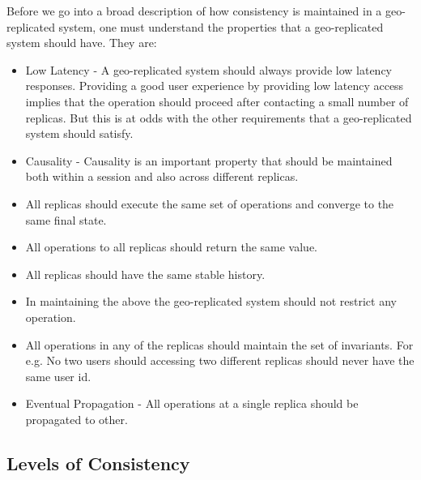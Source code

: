 \documentclass[12pt]{article}
\theoremstyle{plain}
\theoremstyle{definition}
\theoremstyle{remark}
\begin{document}
Before we go into a broad description of how consistency is maintained in a geo-replicated system, one must understand the properties that a geo-replicated system should have. They are:
\begin{itemize}
\item Low Latency - A geo-replicated system should always provide low latency responses. Providing a good user experience by providing low latency access implies that the operation should proceed after contacting a small number of replicas. But this is at odds with the other requirements that a geo-replicated system should satisfy.
\item Causality - Causality is an important property that should be maintained both within a session and also across different replicas.
\item All replicas should execute the same set of operations and converge to the same final state.
\item All operations to all replicas should return the same value.
\item All replicas should have the same stable history. 
\item In maintaining the above the geo-replicated system should not restrict any operation.
\item All operations in any of the replicas should maintain the set of invariants. For e.g. No two users should accessing two different replicas should never have the same user id.
\item Eventual Propagation - All operations at a single replica should be propagated to other.
\end{itemize}

\subsection*{Levels of Consistency}
\end{document}

